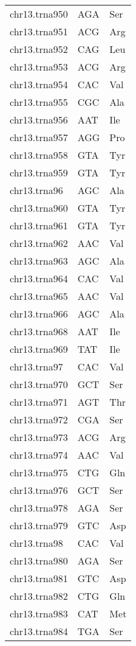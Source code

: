 \begin{longtable}{@{}l>{\collectcell\anticodon}l<{\endcollectcell}l@{}}
    chr13.trna950 & AGA & Ser \\
    chr13.trna951 & ACG & Arg \\
    chr13.trna952 & CAG & Leu \\
    chr13.trna953 & ACG & Arg \\
    chr13.trna954 & CAC & Val \\
    chr13.trna955 & CGC & Ala \\
    chr13.trna956 & AAT & Ile \\
    chr13.trna957 & AGG & Pro \\
    chr13.trna958 & GTA & Tyr \\
    chr13.trna959 & GTA & Tyr \\
    chr13.trna96 & AGC & Ala \\
    chr13.trna960 & GTA & Tyr \\
    chr13.trna961 & GTA & Tyr \\
    chr13.trna962 & AAC & Val \\
    chr13.trna963 & AGC & Ala \\
    chr13.trna964 & CAC & Val \\
    chr13.trna965 & AAC & Val \\
    chr13.trna966 & AGC & Ala \\
    chr13.trna968 & AAT & Ile \\
    chr13.trna969 & TAT & Ile \\
    chr13.trna97 & CAC & Val \\
    chr13.trna970 & GCT & Ser \\
    chr13.trna971 & AGT & Thr \\
    chr13.trna972 & CGA & Ser \\
    chr13.trna973 & ACG & Arg \\
    chr13.trna974 & AAC & Val \\
    chr13.trna975 & CTG & Gln \\
    chr13.trna976 & GCT & Ser \\
    chr13.trna978 & AGA & Ser \\
    chr13.trna979 & GTC & Asp \\
    chr13.trna98 & CAC & Val \\
    chr13.trna980 & AGA & Ser \\
    chr13.trna981 & GTC & Asp \\
    chr13.trna982 & CTG & Gln \\
    chr13.trna983 & CAT & Met \\
    chr13.trna984 & TGA & Ser \\

\end{longtable}
